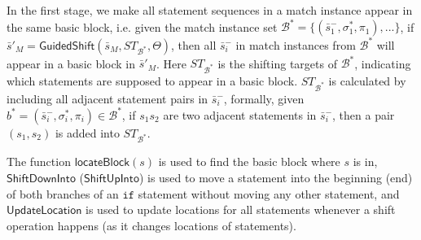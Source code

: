 \documentclass[a4paper, USenglish]{lipics-v2016}
\theoremstyle{plain}
\begin{document}
In the first stage, we
make all statement sequences 
in a match instance appear in the same basic block, i.e. given the match
instance set $\mathcal{B}^*=\{(\bar{s}_1^-,\sigma_1^*,\pi_1),...\}$,
if $\bar{s}'_M=\mathsf{GuidedShift}(\bar{s}_M,
\mathit{ST}_{\mathcal{B}^*}, \Theta)$, then all $\bar{s}^-_i$ in match
instances from $\mathcal{B}^*$ will appear in a basic block in
$\bar{s}'_M$. Here ${ST}_{\mathcal{B}^*}$ is the shifting targets of $\mathcal{B}^*$, indicating which statements are supposed to appear in a basic block. ${ST}_{\mathcal{B}^*}$ is calculated by including all adjacent statement pairs in $\bar{s}^-_i$, formally, given $b^*=(\bar{s}_i^-,\sigma_i^*,\pi_i)\in \mathcal{B}^*$, if $s_1s_2$ are two adjacent statements in $\bar{s}^-_i$, then a pair $(s_1,s_2)$ is added into $\mathit{ST}_{\mathcal{B}^{*}}$.

The function $\mathsf{locateBlock}(s)$ is used to find the basic block
where $s$ is in, $\mathsf{ShiftDownInto}$ ($\mathsf{ShiftUpInto}$) is
used to move a statement into the beginning (end) of both branches of an $\mathtt{if}$ statement
without moving any other statement, and $\mathsf{UpdateLocation}$ is used to update locations for all statements whenever a shift operation happens (as it changes locations of statements).
\end{document}
